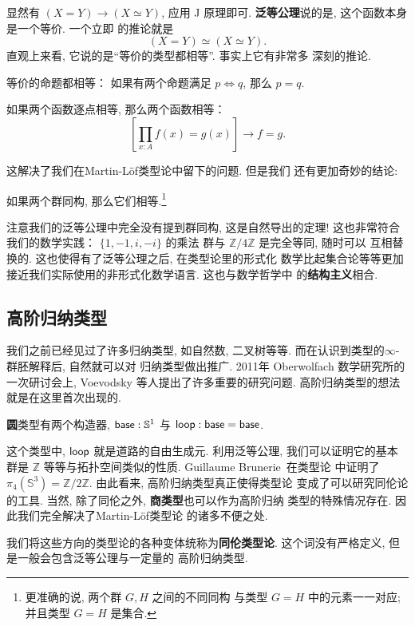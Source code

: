 显然有 \((X = Y) \to (X \simeq Y)\), 应用 J 原理即可.
\textbf{泛等公理}说的是, 这个函数本身是一个等价. 一个立即
的推论就是
\[(X = Y) \simeq (X \simeq Y).\]
直观上来看, 它说的是“等价的类型都相等”. 事实上它有非常多
深刻的推论.
\begin{theorem}[命题外延]
等价的命题都相等： 如果有两个命题满足
\(p \iff q\), 那么 \(p = q\).
\end{theorem}
\begin{theorem}[函数外延]
如果两个函数逐点相等, 那么两个函数相等：
\[\left[\prod_{x:A} f(x) = g(x)\right] \to f = g.\]
\end{theorem}
这解决了我们在Martin-L\"of类型论中留下的问题. 但是我们
还有更加奇妙的结论:
\begin{theorem}
如果两个群同构, 那么它们相等.\footnote{更准确的说, 两个群 \(G, H\) 之间的不同同构
与类型 \(G = H\) 中的元素一一对应; 并且类型 \(G = H\) 是集合.}
\end{theorem}
注意我们的泛等公理中完全没有提到群同构, 这是自然导出的定理!
这也非常符合我们的数学实践： \(\{1,-1,i,-i\}\) 的乘法
群与 \(\mathbb Z/4\mathbb Z\) 是完全等同, 随时可以
互相替换的. 这也使得有了泛等公理之后, 在类型论里的形式化
数学比起集合论等等更加接近我们实际使用的非形式化数学语言.
这也与数学哲学中
的\textbf{结构主义}相合.~\cite{awodey:2013:structuralism}

\subsection{高阶归纳类型}
我们之前已经见过了许多归纳类型, 如自然数, 二叉树等等.
而在认识到类型的\(\infty\)-群胚解释后, 自然就可以对
归纳类型做出推广. 2011年 Oberwolfach 数学研究所的
一次研讨会上, Voevodsky 等人提出了许多重要的研究问题.
高阶归纳类型的想法就是在这里首次出现的.

\begin{definition}
\textbf{圆}类型有两个构造器, \(\textsf{base} : \mathbb S^1\)
与 \(\textsf{loop} : \textsf{base} = \textsf{base}\).
\end{definition}
这个类型中, \(\textsf{loop}\) 就是道路的自由生成元.
利用泛等公理, 我们可以证明它的基本群是 \(\mathbb Z\)
等等与拓扑空间类似的性质. Guillaume Brunerie~\cite{brunerie:2016:number}在类型论
中证明了 \(\pi_4(\mathbb S^3) = \mathbb Z / 2\mathbb Z\).
由此看来, 高阶归纳类型真正使得类型论
变成了可以研究同伦论的工具.
当然, 除了同伦之外, \textbf{商类型}也可以作为高阶归纳
类型的特殊情况存在. 因此我们完全解决了Martin-L\"of类型论
的诸多不便之处.

我们将这些方向的类型论的各种变体统称为\textbf{同伦类型论}.
这个词没有严格定义, 但是一般会包含泛等公理与一定量的
高阶归纳类型.

